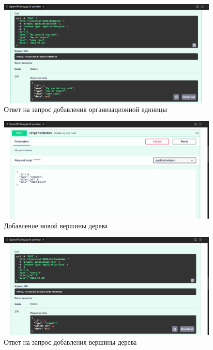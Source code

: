 \begin{figure}
    \includegraphics[scale=0.2]{../img/swagger4.png}
    \caption{Ответ на запрос добавления организационной единицы}
    \label{swagger4}
\end{figure}

\begin{figure}
    \includegraphics[scale=0.2]{../img/swagger5.png}
    \caption{Добавление новой вершины дерева}
    \label{swagger5}
\end{figure}

\begin{figure}
    \includegraphics[scale=0.2]{../img/swagger6.png}
    \caption{Ответ на запрос добавления вершины дерева}
    \label{swagger6}
\end{figure}

